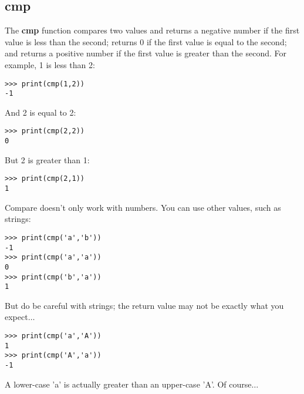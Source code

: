 \subsection*{cmp}

The \textbf{cmp} function compares two values and returns a negative number if the first value is less than the second; returns 0 if the first value is equal to the second; and returns a positive number if the first value is greater than the second. For example, 1 is less than 2:

\begin{listing}
\begin{verbatim}
>>> print(cmp(1,2))
-1
\end{verbatim}
\end{listing}

\noindent
And 2 is equal to 2:

\begin{listing}
\begin{verbatim}
>>> print(cmp(2,2))
0
\end{verbatim}
\end{listing}

\noindent
But 2 is greater than 1:

\begin{listing}
\begin{verbatim}
>>> print(cmp(2,1))
1
\end{verbatim}
\end{listing}

\noindent
Compare doesn't only work with numbers. You can use other values, such as strings:

\begin{listing}
\begin{verbatim}
>>> print(cmp('a','b'))
-1
>>> print(cmp('a','a'))
0
>>> print(cmp('b','a'))
1
\end{verbatim}
\end{listing}

\noindent
But do be careful with strings; the return value may not be exactly what you expect$\ldots$

\begin{listing}
\begin{verbatim}
>>> print(cmp('a','A'))
1
>>> print(cmp('A','a'))
-1
\end{verbatim}
\end{listing}

A lower-case 'a' is actually greater than an upper-case 'A'. Of course$\ldots$


